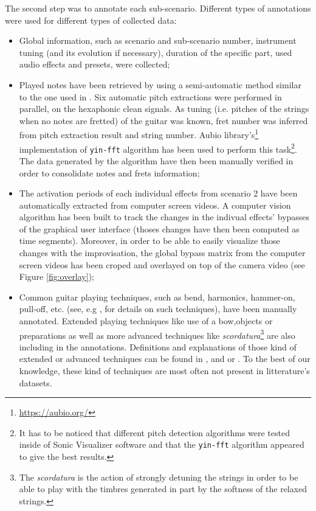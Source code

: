 \documentclass{article}
\begin{document}
The second step was to annotate each sub-scenario. Different types of annotations were used for different types of collected data: 
\begin{itemize}
\item Global information, such as scenario and sub-scenario number, instrument tuning (and its evolution if necessary), duration of the specific part, used audio effects and presets, were collected;

\item Played notes have been retrieved by using a semi-automatic method similar to the one used in \cite{sci:Xi2018}. Six automatic pitch extractions were performed in parallel, on the hexaphonic clean signals. As tuning (i.e. pitches of the strings when no notes are fretted) of the guitar was known, fret number was inferred from pitch extraction result and string number.  Aubio library's\footnote{\url{https://aubio.org/}} implementation of \texttt{yin-fft} algorithm \cite{sci:Brossier_yinFFT} has been used to perform this task\footnote{It has to be noticed that different pitch detection algorithms were tested inside of Sonic Visualizer software and that the \texttt{yin-fft} algorithm appeared to give the best results. }. The data generated by the algorithm have then been manually verified in order to consolidate notes and frets information; 

\item The activation periods of each individual effects from scenario 2 have been automatically extracted from computer screen videos. A computer vision algorithm has been built to track the changes in the indivual effects' bypasses of the graphical user interface (thoses changes have then been computed as time segments). Moreover, in order to be able to easily visualize those changes with the improvisation, the global bypass matrix from the computer screen videos has been croped and overlayed on top of the camera video (see Figure \ref{fig:overlay});

\item Common guitar playing techniques, such as bend, harmonics, hammer-on, pull-off, etc. (see, e.g \cite{sci:Su2014a}, for details on such techniques), have been manually annotated. Extended playing techniques like use of a bow,objects or preparations as well as more advanced techniques like \textit{scordatura}\footnote{The \textit{scordatura} is the action of strongly detuning the strings in order to be able to play with
the timbres generated in part by the softness of the relaxed strings.} are also including in the annotations. Definitions and explanations of those kind of extended or advanced techniques can be found in \cite{Josel2014},  \cite{organo:schndeider2015_microtones} and \cite{organo:Landman2012} or \cite{organo:ElgartYates1990}. To the best of our knowledge, these kind of techniques are most often not present in litterature's datasets.
\end{itemize}
\end{document}
